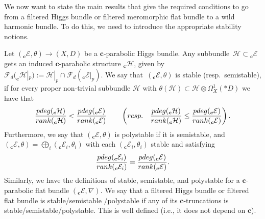 \documentclass[11pt]{article}
\numberwithin{equation}{section}
\numberwithin{equation}{section}
\begin{document}
We now want to state the main results that give the required conditions to go from a filtered Higgs bundle or filtered meromorphic flat bundle to a wild harmonic bundle. To do this, we need to introduce the appropriate stability notions.

\begin{Definition} Let $(_{\boldsymbol{c}}\mathcal{E},\theta)\to (X,D)$ be a $\boldsymbol{c}$-parabolic Higgs bundle. Any subbundle~${\mathcal{H}\subset {_{\boldsymbol{c}}\mathcal{E}}}$ gets an induced $\boldsymbol{c}$-parabolic structure $_{\boldsymbol{c}}\mathcal{H}$, given by $\mathcal{F}_d(_{\boldsymbol{c}}\mathcal{H}|_p):=\mathcal{H}|_p\cap \mathcal{F}_d(_{\boldsymbol{c}}\mathcal{E}|_p)$. We say that~$(_{\boldsymbol{c}}\mathcal{E},\theta)$ is stable (resp.\ semistable), if for every proper non-trivial subbundle $\mathcal{H}$ with $\theta(\mathcal{H})\subset \mathcal{H}\otimes \Omega^1_X(*D)$ we have that
\begin{equation*}
 \frac{\textnormal{pdeg}(_{\boldsymbol{c}}\mathcal{H})}{\textnormal{rank}(_{\boldsymbol{c}}\mathcal{H})}<\frac{\textnormal{pdeg}(_{\boldsymbol{c}}\mathcal{E})}{\textnormal{rank}(_{\boldsymbol{c}}\mathcal{E})} \qquad \left(\textnormal{resp.} \quad \frac{\textnormal{pdeg}(_{\boldsymbol{c}}\mathcal{H})}{\textnormal{rank}(_{\boldsymbol{c}}\mathcal{H})}\leq\frac{\textnormal{pdeg}
 (_{\boldsymbol{c}}\mathcal{E})}{\textnormal{rank}(_{\boldsymbol{c}}\mathcal{E})}\right) .
\end{equation*}
Furthermore, we say that $(_{\boldsymbol{c}}\mathcal{E},\theta)$ is polystable if it is semistable, and $(_{\boldsymbol{c}}\mathcal{E},\theta)=\bigoplus_{i}(_{\boldsymbol{c}}\mathcal{E}_i,\theta_i)$ with each $(_{\boldsymbol{c}}\mathcal{E}_i,\theta_i)$ stable and satisfying
\begin{equation*}
 \frac{\textnormal{pdeg}(_{\boldsymbol{c}}\mathcal{E}_i)}{\textnormal{rank}(_{\boldsymbol{c}}\mathcal{E}_i)}=\frac{\textnormal{pdeg}(_{\boldsymbol{c}}\mathcal{E})}{\textnormal{rank}(_{\boldsymbol{c}}\mathcal{E})}.
\end{equation*}
Similarly, we have the definitions of stable, semistable, and polystable for a $\boldsymbol{c}$-parabolic flat bundle $(_{\boldsymbol{c}}\mathcal{E},\nabla)$. We say that a filtered Higgs bundle or filtered flat bundle is stable/semistable /polystable if any of its $\boldsymbol{c}$-truncations is stable/semistable/polystable. This is well defined (i.e., it does not depend on $\boldsymbol{c}$).
\end{Definition}
\end{document}
